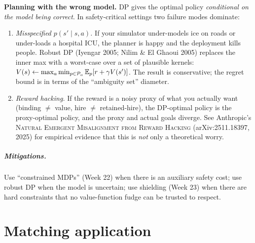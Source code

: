 \documentclass[11pt,oneside]{scrbook}
\begin{document}
\begin{safetyangle}
\textbf{Planning with the wrong model.} DP gives the optimal policy
\emph{conditional on the model being correct}. In safety-critical settings two
failure modes dominate:

\begin{enumerate}\setlength\itemsep{2pt}
  \item \emph{Misspecified $p(s'\mid s,a)$.} If your simulator under-models
        ice on roads or under-loads a hospital ICU, the planner is happy and
        the deployment kills people. Robust DP (Iyengar 2005; Nilim \& El
        Ghaoui 2005) replaces the inner max with a worst-case over a set
        of plausible kernels: $V(s) \gets \max_a \min_{p\in\mathcal{P}_a}
        \mathbb{E}_p[r + \gamma V(s')]$. The result is conservative; the regret
        bound is in terms of the ``ambiguity set'' diameter.
  \item \emph{Reward hacking.} If the reward is a noisy proxy of what you
        actually want (binding $\ne$ value, hire $\ne$ retained-hire), the
        DP-optimal policy is the proxy-optimal policy, and the proxy and
        actual goals diverge. See Anthropic's
        \textsc{Natural Emergent Misalignment from Reward Hacking}
        (arXiv:2511.18397, 2025) for empirical evidence that this is
        \emph{not} only a theoretical worry.
\end{enumerate}

\paragraph{Mitigations.} Use ``constrained MDPs'' (Week 22) when there is an
auxiliary safety cost; use robust DP when the model is uncertain; use
shielding (Week 23) when there are hard constraints that no value-function
fudge can be trusted to respect.
\end{safetyangle}

\chapter{Matching application}
\end{document}
